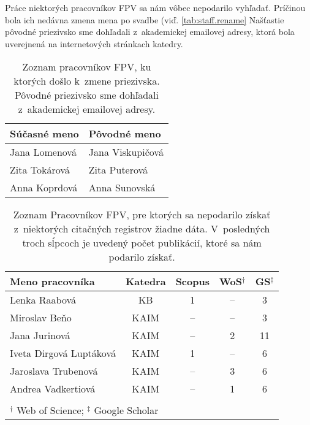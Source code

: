 Práce niektorých pracovníkov FPV sa nám vôbec nepodarilo vyhľadať. Príčinou
bola ich nedávna zmena mena po svadbe (viď. \ref{tab:staff.rename} Našťastie
pôvodné priezivsko sme dohľadali z~akademickej emailovej adresy, ktorá bola
uverejnená na internetových stránkach katedry.

\begin{SCtable}
\centering\small
  \caption[Mená pracovníkov FPV, u~ktorých došlo k~zmene priezivska] {Zoznam
  pracovníkov FPV, ku ktorých došlo k~zmene priezivska. Pôvodné priezivsko sme
  dohľadali z~akademickej emailovej adresy.}
\label{tab:staff,rename}
\begin{tabular}{ll}
  \toprule\noalign{\vspace{.3ex}}
  Súčasné meno    & Pôvodné meno  \\[0.3ex]
  \midrule\noalign{\vspace{.5ex}}
  Jana Lomenová & Jana Viskupičová \\
  Zita Tokárová & Zita Puterová \\
  Anna Koprdová & Anna Sunovská \\[0.5ex]
  \bottomrule 
\end{tabular}
\end{SCtable}

\begin{SCtable}
\centering\small
  \caption[Mená pracovníkov FPV, pre ktorých sa nám nepodarilo získať všetky
  dáta]{Zoznam Pracovníkov FPV, pre ktorých sa nepodarilo získať z~niektorých
  citačných registrov žiadne dáta.  V~posledných troch sĺpcoch je uvedený počet
  publikácií, ktoré sa nám podarilo získať.}
\label{tab:staff.missing}
\begin{tabular}{lcccc}
  \toprule\noalign{\vspace{.3ex}}
  Meno pracovníka            & Katedra & Scopus & WoS$^\dagger$ & GS$^\ddagger$ \\[0.3ex]
  \midrule\noalign{\vspace{.5ex}}
  Lenka Raabová              &  KB  &  1     & --  & 3  \\
  Miroslav Beňo              & KAIM & --     & --  & 3  \\
  Jana Jurinová              & KAIM & --     & 2   & 11 \\
  Iveta Dirgová Luptáková    & KAIM & 1      & --  & 6  \\
  Jaroslava Trubenová        & KAIM & --     & 3   & 6  \\
  Andrea Vadkertiová         & KAIM & --     & 1   & 6  \\[0.5ex]
  \bottomrule \\[-2ex]
  \multicolumn{5}{l}{\footnotesize $^\dagger$ Web of Science; $^\ddagger$ Google Scholar} 
\end{tabular}
\end{SCtable}


